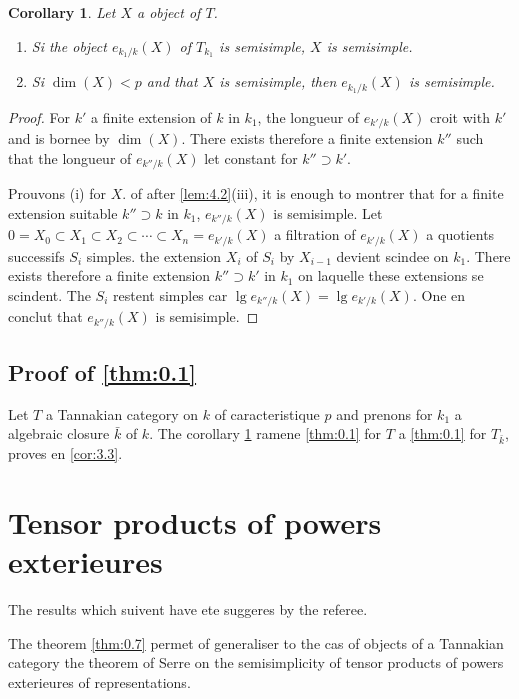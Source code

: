 \documentclass[11pt,a4paper]{article}
\theoremstyle{plain}
\newtheorem{corollary}[theorem]{Corollary}
\theoremstyle{definition}
\begin{document}
\begin{corollary}\label{cor:4.11}
Let $X$ a object of $T$.
\begin{enumerate}[label=(\roman*)]
\item Si the object $e_{k_1/k}(X)$ of $T_{k_1}$ is semisimple, $X$ is semisimple.
\item Si $\dim(X) < p$ and that $X$ is semisimple, then $e_{k_1/k}(X)$ is semisimple.
\end{enumerate}
\end{corollary}

\begin{proof}
For $k'$ a finite extension of $k$ in $k_1$, the longueur of $e_{k'/k}(X)$ croit with $k'$ and is bornee by $\dim(X)$. There exists therefore a finite extension $k''$ such that the longueur of $e_{k''/k}(X)$ let constant for $k'' \supset k'$.

Prouvons (i) for $X$. of after \ref{lem:4.2}(iii), it is enough to montrer that for a finite extension suitable $k'' \supset k$ in $k_1$, $e_{k''/k}(X)$ is semisimple. Let $0 = X_0 \subset X_1 \subset X_2 \subset \cdots \subset X_n = e_{k'/k}(X)$ a filtration of $e_{k'/k}(X)$ a quotients successifs $S_i$ simples. the extension $X_i$ of $S_i$ by $X_{i-1}$ devient scindee on $k_1$. There exists therefore a finite extension $k'' \supset k'$ in $k_1$ on laquelle these extensions se scindent. The $S_i$ restent simples car $\lg e_{k''/k}(X) = \lg e_{k'/k}(X)$. One en conclut that $e_{k''/k}(X)$ is semisimple.
\end{proof}

\subsection{Proof of \ref{thm:0.1}}\label{sec:4.12}

Let $T$ a Tannakian category on $k$ of caracteristique $p$ and prenons for $k_1$ a algebraic closure $\bar{k}$ of $k$. The corollary \ref{cor:4.11} ramene \ref{thm:0.1} for $T$ a \ref{thm:0.1} for $T_{\bar{k}}$, proves en \ref{cor:3.3}.

\section{Tensor products of powers exterieures}\label{sec:5}

The results which suivent have ete suggeres by the referee.

The theorem \ref{thm:0.7} permet of generaliser to the cas of objects of a Tannakian category the theorem of Serre \cite{Serre2003} on the semisimplicity of tensor products of powers exterieures of representations.
\end{document}
